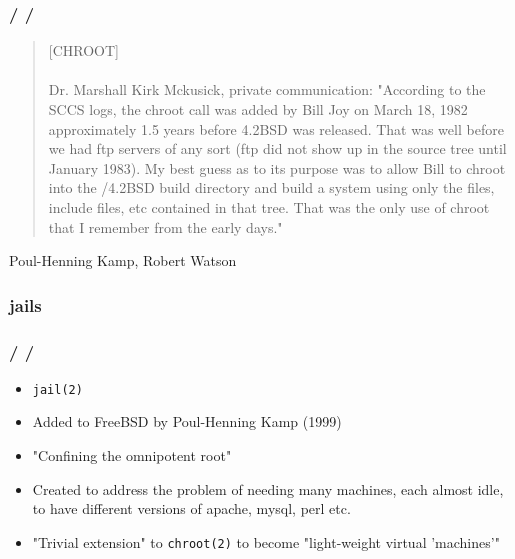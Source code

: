 \documentclass{beamer}
\newcommand{\autotitle}
{\frametitle{
    \secname
    \ifx\insertsubsection\empty
    \else
        /\subsecname
        \ifx\insertsubsubsection\empty\else/\subsubsecname\fi
    \fi}}
\begin{document}
\begin{frame}
    \autotitle
    \begin{quote}
        [CHROOT]
        \\~\\
        Dr. Marshall Kirk Mckusick, private communication: "According to the
        SCCS logs, the chroot call was added by Bill Joy on March 18, 1982
        approximately 1.5 years before 4.2BSD was released.  That was well
        before we had ftp servers of any sort (ftp did not show up in the
        source tree until January 1983).  My best guess as to its purpose was
        to allow Bill to chroot into the /4.2BSD build directory and build a
        system using only the files, include files, etc contained in that tree.
        That was the only use of chroot that I remember from the early days."
    \end{quote}
    Poul-Henning Kamp, Robert Watson \cite{kamp_jails}
\end{frame}

\subsubsection{jails}

\begin{frame}
    \autotitle
    \begin{itemize}
        \item \texttt{jail(2)}
        \item Added to FreeBSD by Poul-Henning Kamp (1999)
        \item "Confining the omnipotent root"
        \item
            Created to address the problem of needing many machines, each
            almost idle, to have different versions of apache, mysql, perl etc.
        \item
            "Trivial extension" to \texttt{chroot(2)} to become "light-weight
            virtual 'machines'"
    \end{itemize}
\end{frame}
\end{document}
